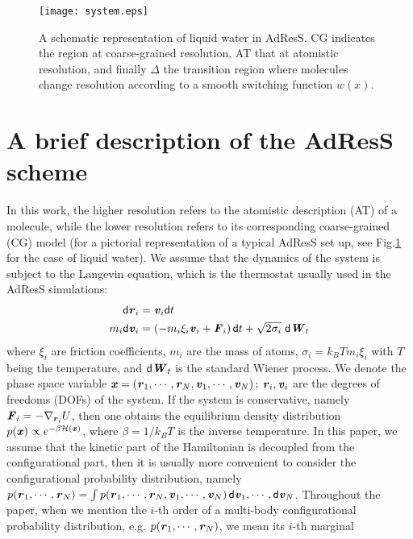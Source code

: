 \documentclass[aps,a4paper,reprint,onecolumn]{revtex4}
\newcommand{\vect}[1]{\textbf{\textit{#1}}}
\newcommand{\dd}[1]{\textsf{#1}}
\begin{document}
\begin{figure}
  \centering
  \texttt{[image: system.eps]}
  \caption{A schematic representation of liquid water in AdResS. CG indicates the region at coarse-grained resolution, AT that at atomistic resolution, and finally $\Delta$ the transition region where molecules change resolution according to a smooth switching function $w(x)$.}
  \label{fig:adress-water}
\end{figure}

\section{A brief description of the AdResS scheme}

In this work, the higher resolution refers to the atomistic
description (AT) of a molecule, while the lower resolution refers to
its corresponding coarse-grained (CG) model (for a pictorial representation of a typical AdResS set up, see Fig.\ref{fig:adress-water} for the case of liquid water).  We assume that the dynamics of the
system is subject to the Langevin equation, which is the thermostat
usually used in the AdResS simulations:
\begin{align}
  \dd d\vect r_i &= \vect v_i\dd dt\\
  m_i\dd d\vect v_i &= (-m_i\xi_i\vect v_i + \vect F_i)\,\dd dt + \sqrt{2\sigma_i}\;\dd d\vect W_t
\end{align}
where $\xi_i$ are friction coefficients,
$m_i$ are the mass of atoms, $\sigma_i = k_BTm_i\xi_i$ with $T$ being
the temperature, and
$\dd d\vect W_t$ is the standard Wiener process. We denote the
phase space variable $\vect x = (\vect r_1,\cdots,\vect r_N, \vect v_1,\cdots,\vect v_N)$; $\vect r_i,
\vect v_i$ are the degrees of freedoms (DOFs) of the system.  If the
system is conservative, namely $\vect F_i = -\nabla_{\vect r_i}U$,
then one obtains the equilibrium density distribution $p(\vect
x)\propto e^{-\beta\mathcal H(\vect x)}$, where $\beta = 1/k_BT$ is the inverse temperature.
  In this paper, we assume that
  the kinetic part of the Hamiltonian is decoupled from the configurational part, then
  it is usually more convenient to consider the configurational
  probability distribution, namely $ p(\vect r_1,\cdots,\vect r_N) =
  \int p(\vect r_1,\cdots,\vect r_N, \vect v_1,\cdots,\vect v_N)\,\dd d\vect v_1,\cdots,\dd d\vect v_N$.
Throughout the paper, when we mention the $i$-th order of a
  multi-body configurational probability distribution, e.g.
  $p(\vect r_1, \cdots, \vect r_N)$, we mean its $i$-th marginal
\end{document}
